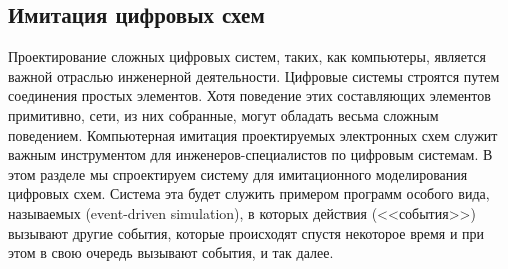 \subsection{Имитация цифровых схем}
\label{A-SIMULATOR-FOR-DIGITAL-CIRCUITS}


Проектирование сложных цифровых систем, таких, как
компьютеры, является важной отраслью инженерной деятельности.
Цифровые системы строятся путем соединения простых элементов. Хотя
поведение этих составляющих элементов примитивно,
сети, из них собранные, могут обладать весьма сложным поведением.
Компьютерная имитация проектируемых электронных схем служит важным
инструментом для инженеров-специалистов по цифровым системам.  В этом
разделе мы спроектируем систему для имитационного моделирования
цифровых схем.  Система эта будет служить примером программ особого вида,
называемых  (event-driven simulation), в которых действия (<<события>>) вызывают
другие события, которые происходят спустя некоторое время и при этом в
свою очередь вызывают события, и так далее.

